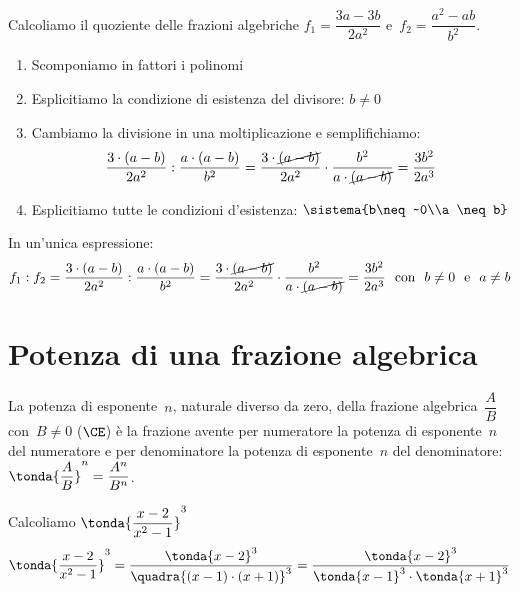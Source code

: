  \begin{esempio}
Calcoliamo il quoziente delle frazioni algebriche
\(f_{1}=\dfrac{3a-3b}{2a^{2}}\) e~\(f_{2}=\dfrac{a^{2}-ab}{b^{2}}\).

\begin{enumerate}
\item Scomponiamo in fattori i polinomi
\item Esplicitiamo la condizione di esistenza del divisore:
\(b \neq 0\)
\item Cambiamo la divisione in una moltiplicazione e semplifichiamo:
\[
\dfrac{3\cdot(a-b)}{2a^{2}}:\dfrac{a\cdot(a-b)}{b^2}=
\dfrac{3\cdot\cancel{(a-b)}}{2a^{2}}\cdot
\dfrac{b^2}{a\cdot\cancel{(a-b)}}=\dfrac{3b^2}{2a^3}
\]
 \item Esplicitiamo tutte le condizioni d'esistenza:
\(\sistema{b\neq~0\\a \neq b}\)
\end{enumerate}
In un'unica espressione:
\[f_1 : f_2 = 
  \dfrac{3\cdot(a-b)}{2a^{2}}:\dfrac{a\cdot(a-b)}{b^2}=
  \dfrac{3\cdot\cancel{(a-b)}}{2a^{2}}\cdot
  \dfrac{b^2}{a\cdot\cancel{(a-b)}}=\dfrac{3b^2}{2a^3} \text{~~con~~}
  b \neq 0 \text{~~e~~} a \neq b\]
 \end{esempio}


\section{Potenza di una frazione algebrica}
\label{sec:frazalg_potenza}

La potenza di esponente~\(n\), naturale diverso da zero, della frazione 
algebrica~\(\dfrac{A}{B}\) con~\(B{\neq}0\) (\(\CE\)) è la frazione
avente per numeratore la potenza di esponente~\(n\) del numeratore e per 
denominatore la potenza di esponente~\(n\)
del denominatore:~\( \tonda{\dfrac{A}{B}} ^{n}=\dfrac{A^{n}}{B^{n}}\).

 \begin{esempio}
Calcoliamo  \( \tonda{\dfrac{x-2}{x^{2}-1}} ^{3}\)
\[\tonda{\dfrac{x-2}{x^{2}-1}} ^{3} =
\dfrac{\tonda{x-2}^3}{\quadra{(x-1)\cdot(x+1)}^3} = 
  \dfrac{\tonda{x-2}^3}{\tonda{x-1}^3 \cdot \tonda{x+1}^3}\]
 \end{esempio}

